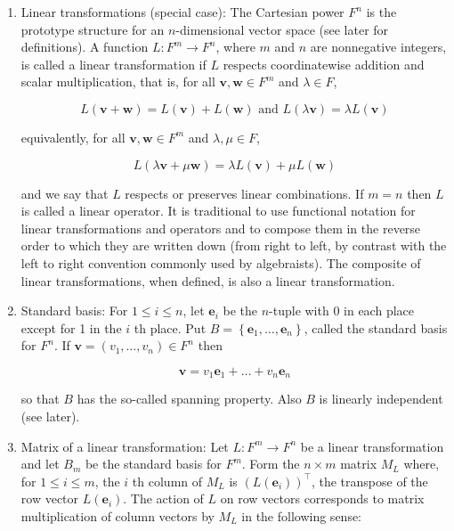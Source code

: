 \documentclass{article}
\begin{document}
\begin{enumerate}
        \item Linear transformations (special case): The Cartesian power $F^{n}$ is the prototype structure for an $n$-dimensional vector space (see later for definitions). A function $L: F^{m} \rightarrow F^{n}$, where $m$ and $n$ are nonnegative integers, is called a linear transformation if $L$ respects coordinatewise addition and scalar multiplication, that is, for all $\mathbf{v}, \mathbf{w} \in F^{m}$ and $\lambda \in F$,

        $$
        L(\mathbf{v}+\mathbf{w})=L(\mathbf{v})+L(\mathbf{w}) \text { and } L(\lambda \mathbf{v})=\lambda L(\mathbf{v})
        $$

        equivalently, for all $\mathbf{v}, \mathbf{w} \in F^{m}$ and $\lambda, \mu \in F$,

        $$
        L(\lambda \mathbf{v}+\mu \mathbf{w})=\lambda L(\mathbf{v})+\mu L(\mathbf{w})
        $$

        and we say that $L$ respects or preserves linear combinations. If $m=n$ then $L$ is called a linear operator. It is traditional to use functional notation for linear transformations and operators and to compose them in the reverse order to which they are written down (from right to left, by contrast with the left to right convention commonly used by algebraists). The composite of linear transformations, when defined, is also a linear transformation.\\

        \item Standard basis: For $1 \leq i \leq n$, let $\mathbf{e}_{i}$ be the $n$-tuple with 0 in each place except for 1 in the $i$ th place. Put $B=\left\{\mathbf{e}_{1}, \ldots, \mathbf{e}_{n}\right\}$, called the standard basis for $F^{n}$. If $\mathbf{v}=\left(v_{1}, \ldots, v_{n}\right) \in F^{n}$ then

        $$
        \mathbf{v}=v_{1} \mathbf{e}_{1}+\ldots+v_{n} \mathbf{e}_{n}
        $$

        so that $B$ has the so-called spanning property. Also $B$ is linearly independent (see later).

        \item Matrix of a linear transformation: Let $L: F^{m} \rightarrow F^{n}$ be a linear transformation and let $B_{m}$ be the standard basis for $F^{m}$. Form the $n \times m$ matrix $M_{L}$ where, for $1 \leq i \leq m$, the $i$ th column of $M_{L}$ is $\left(L\left(\mathbf{e}_{i}\right)\right)^{\top}$, the transpose of the row vector $L\left(\mathbf{e}_{i}\right)$. The action of $L$ on row vectors corresponds to matrix multiplication of column vectors by $M_{L}$ in the following sense:


\end{enumerate}
\end{document}

